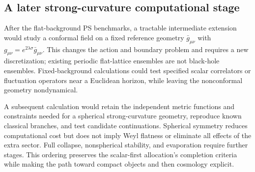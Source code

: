 \subsection{A later strong-curvature computational stage}
\label{sec:black-hole-stage}

After the flat-background PS benchmarks, a tractable intermediate extension would study a conformal field on a fixed reference geometry $\bar g_{\mu\nu}$ with $g_{\mu\nu}=e^{2\lambda\sigma}\bar g_{\mu\nu}$.  This changes the action and boundary problem and requires a new discretization; existing periodic flat-lattice ensembles are not black-hole ensembles.  Fixed-background calculations could test specified scalar correlators or fluctuation operators near a Euclidean horizon, while leaving the nonconformal geometry nondynamical.

A subsequent calculation would retain the independent metric functions and constraints needed for a spherical strong-curvature geometry, reproduce known classical branches, and test candidate continuations.  Spherical symmetry reduces computational cost but does not imply Weyl flatness or eliminate all effects of the extra sector.  Full collapse, nonspherical stability, and evaporation require further stages.  This ordering preserves the scalar-first allocation's completion criteria while making the path toward compact objects and then cosmology explicit.
